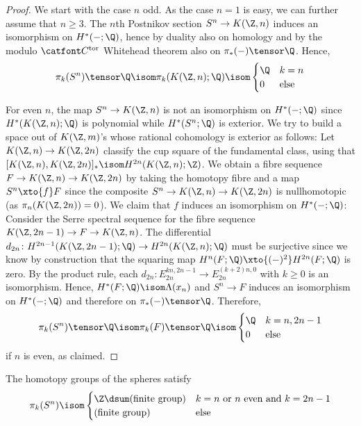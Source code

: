 \begin{proof}
	We start with the case $n$ odd.
	As the case $n = 1$ is easy, we can further assume that $n \geq 3$.
	The $n$th Postnikov section $S^n \to K(\Z, n)$ induces an isomorphism on $H^*({{-}}; \Q)$, hence by duality also on homology and by the modulo $\Ctor$ Whitehead theorem also on $\pi_*({{-}}) \tensor \Q$.
	Hence,
	\begin{equation*}
		\pi_k(S^n) \tensor \Q \isom \pi_k(K(\Z, n); \Q) \isom \begin{cases}
			\Q 	& k = n \\
			0 	& \text{else}
		\end{cases}
	\end{equation*}

	For even $n$, the map $S^n \to K(\Z, n)$ is not an isomorphism on $H^*({{-}}; \Q)$ since $H^*(K(\Z, n); \Q)$ is polynomial while $H^*(S^n; \Q)$ is exterior.
	We try to build a space out of $K(\Z, m)$'s whose rational cohomology is exterior as follows:
	Let $K(\Z, n) \to K(\Z, 2n)$ classify the cup square of the fundamental class, using that $[K(\Z, n), K(\Z, 2n)]_* \isom H^{2n}(K(\Z, n); \Z)$.
	We obtain a fibre sequence $F \to K(\Z, n) \to K(\Z, 2n)$ by taking the homotopy fibre and a map $S^n \xto{f} F$ since the composite $S^n \to K(\Z, n) \to K(\Z, 2n)$ is nullhomotopic (as $\pi_n(K(\Z, 2n)) = 0$).
	We claim that $f$ induces an isomorphism on $H^*({{-}}; \Q)$:
	Consider the Serre spectral sequence for the fibre sequence $K(\Z, 2n - 1) \to F \to K(\Z, n)$.
	The differential $d_{2n}\colon H^{2n - 1}(K(\Z, 2n - 1); \Q) \to H^{2n}(K(\Z, n); \Q)$ must be surjective since we know by construction that the squaring map $H^n(F; \Q) \xto{({{-}})^2} H^{2n}(F; \Q)$ is zero.
	By the product rule, each $d_{2n}\colon E_{2n}^{kn, 2n - 1} \to E_{2n}^{(k + 2)n, 0}$ with $k \geq 0$ is an isomorphism.
	Hence, $H^*(F; \Q) \isom \Lambda(x_n)$ and $S^n \to F$ induces an isomorphism on $H^*({{-}}; \Q)$ and therefore on $\pi_*({{-}}) \tensor \Q$.
	Therefore,
	\begin{equation*}
		\pi_k(S^n) \tensor \Q \isom \pi_k(F) \tensor \Q \isom \begin{cases}
			\Q 	& k = n, 2n - 1 \\
			0 	& \text{else}
		\end{cases}
	\end{equation*}
	if $n$ is even, as claimed.
\end{proof}
\begin{corollary}
	The homotopy groups of the spheres satisfy
	\begin{equation*}
		\pi_k(S^n) \isom \begin{cases}
			\Z \dsum \text{(finite group)} 	& k = n \text{ or } n \text{ even and } k = 2n - 1 \\
			\text{(finite group)} 			& \text{else}
		\end{cases}
	\end{equation*}
\end{corollary}
